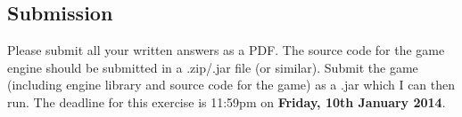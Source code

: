 \documentclass[10pt,a4paper,fleqn]{exam}
\begin{document}
\begin{questions}
\section*{Submission}

Please submit all your written answers as a PDF. The source code for the game engine should be submitted in a .zip/.jar file (or similar). Submit the game (including engine library and source code for the game) as a .jar which I can then run. The deadline for this exercise is 11:59pm on \textbf{Friday, 10th January 2014}.

\end{questions}
\end{document}

